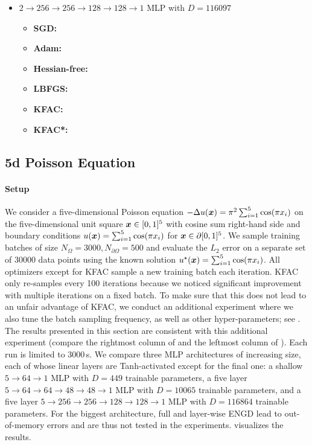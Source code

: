 \begin{itemize}
\item $2 \to 256 \to 256\to 128 \to 128 \to 1$ MLP with $D=\num{116097}$
  \begin{itemize}
    \def\pathToRuns{../kfac_pinns_exp/exp20_poisson2d_mlp_tanh_256/tex}
  \item \textbf{SGD:} 
  \item \textbf{Adam:} 
  \item \textbf{Hessian-free:} 
  \item \textbf{LBFGS:} 
  \item \textbf{KFAC:} 
  \item \textbf{KFAC*:} 
  \end{itemize}
\end{itemize}

\subsection{5d Poisson Equation}\label{sec:poisson5d-appendix}

\paragraph{Setup} We consider a five-dimensional Poisson equation $-\Delta u({\bm{x}}) = \pi^2 \sum_{i=1}^5 \cos(\pi {x}_i)$ on the five-dimensional unit square ${\bm{x}} \in [0, 1]^5$ with cosine sum right-hand side and boundary conditions $u({\bm{x}}) = \sum_{i=1}^5 \cos(\pi {x}_i)$ for ${\bm{x}} \in \partial [0,1]^5$.
We sample training batches of size $N_{\Omega} = \num{3000}, N_{\partial\Omega} = 500$ and evaluate the $L_2$ error on a separate set of $\num{30000}$ data points using the known solution $u^{\star}({\bm{x}}) = \sum_{i=1}^5 \cos(\pi {x}_i)$.
All optimizers except for KFAC sample a new training batch each iteration.
KFAC only re-samples every 100 iterations because we noticed  significant improvement with multiple iterations on a fixed batch.
To make sure that this does not lead to an unfair advantage of KFAC, we conduct an additional experiment where we also tune the batch sampling frequency, as well as other hyper-parameters; see .
The results presented in this section are consistent with this additional experiment (compare the rightmost column of  and the leftmost column of ).
Each run is limited to 3000\,s.
We compare three MLP architectures of increasing size, each of whose linear layers are Tanh-activated except for the final one: a shallow $5\to 64\to 1$ MLP with $D=449$ trainable parameters, a five layer $5 \to 64 \to 64 \to 48 \to 48 \to 1$ MLP with $D=\num{10065}$ trainable parameters, and a five layer $5 \to 256 \to 256\to 128 \to 128 \to 1$ MLP with $D=\num{116864}$ trainable parameters.
For the biggest architecture, full and layer-wise ENGD lead to out-of-memory errors and are thus not tested in the experiments.
 visualizes the results.


